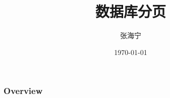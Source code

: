 \documentclass{beamer}
\title[数据库分页]{数据库分页} %
\author{张海宁} %
\institute[Guizhou University] %
{
贵州大学 \\ %
\medskip
\textit{hnzhang1@gzu.edu.cn} %
}
\date{\today} %
\begin{document}
\begin{frame}
\titlepage %
\end{frame}

\begin{frame}
\frametitle{Overview} %
\tableofcontents %
\end{frame}


\end{document}
